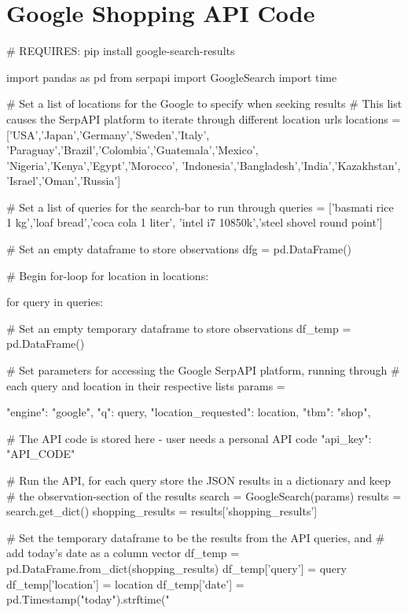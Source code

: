 
\appendix


\section{Google Shopping API Code}
\label{appendixA}
\begin{python}
# REQUIRES: pip install google-search-results

import pandas as pd
from serpapi import GoogleSearch
import time

# Set a list of locations for the Google to specify when seeking results
# This list causes the SerpAPI platform to iterate through different location urls
locations = ['USA','Japan','Germany','Sweden','Italy',
            'Paraguay','Brazil','Colombia','Guatemala','Mexico',
            'Nigeria','Kenya','Egypt','Morocco',
            'Indonesia','Bangladesh','India','Kazakhstan',
            'Israel','Oman','Russia']

# Set a list of queries for the search-bar to run through
queries = ['basmati rice 1 kg','loaf bread','coca cola 1 liter',
           'intel i7 10850k','steel shovel round point']

# Set an empty dataframe to store observations
dfg = pd.DataFrame()

# Begin for-loop
for location in locations:
    
    for query in queries:
        
        # Set an empty temporary dataframe to store observations
        df_temp = pd.DataFrame()
        
        # Set parameters for accessing the Google SerpAPI platform, running through 
        # each query and location in their respective lists
        params = {
            "engine": "google",
            "q": query,
            "location_requested": location,
            "tbm": "shop",
                            
            # The API code is stored here - user needs a personal API code
            "api_key": "API_CODE"
        }
        
        # Run the API, for each query store the JSON results in a dictionary and keep  
        # the observation-section of the results
        search = GoogleSearch(params)
        results = search.get_dict()
        shopping_results = results['shopping_results']
        
        # Set the temporary dataframe to be the results from the API queries, and 
        # add today's date as a column vector
        df_temp = pd.DataFrame.from_dict(shopping_results)
        df_temp['query'] = query
        df_temp['location'] = location
        df_temp['date'] = pd.Timestamp("today").strftime("%
        

\end{python}
